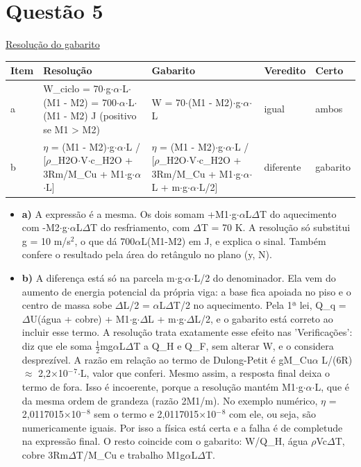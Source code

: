 \documentclass{article}%
\begin{document}
\section*{Questão 5}%
\href{https://poliedroresolve.sistemapoliedro.com.br/vestibulares/ita/2026/ita-2-fase-dia-3-30-10-2025-2-fase-dia-3/dissertativa-5-fisica-2-fase-dia-3-ita-2026}{Resolução do gabarito}\par\smallskip%
\begin{longtable}{@{}p{} p{} p{} p{} p{}@{}}\toprule Item & Resolução & Gabarito & Veredito & Certo \\ \midrule
a & W\_ciclo = 70$\cdot$g$\cdot$$\alpha$$\cdot$L$\cdot$(M1 - M2) = 700$\cdot$$\alpha$$\cdot$L$\cdot$(M1 - M2) J (positivo se M1 > M2) & W = 70$\cdot$(M1 - M2)$\cdot$g$\cdot$$\alpha$$\cdot$L & igual & ambos \\
b & $\eta$ = (M1 - M2)$\cdot$g$\cdot$$\alpha$$\cdot$L / {[}$\rho$\_H2O$\cdot$V$\cdot$c\_H2O + 3Rm/M\_Cu + M1$\cdot$g$\cdot$$\alpha$$\cdot$L{]} & $\eta$ = (M1 - M2)$\cdot$g$\cdot$$\alpha$$\cdot$L / {[}$\rho$\_H2O$\cdot$V$\cdot$c\_H2O + 3Rm/M\_Cu + M1$\cdot$g$\cdot$$\alpha$$\cdot$L + m$\cdot$g$\cdot$$\alpha$$\cdot$L/2{]} & diferente & gabarito \\
\bottomrule\end{longtable}%
\begin{itemize}%
\item%
\textbf{a)} A expressão é a mesma. Os dois somam +M1$\cdot$g$\cdot$$\alpha$L$\Delta$T do aquecimento com -M2$\cdot$g$\cdot$$\alpha$L$\Delta$T do resfriamento, com $\Delta$T = 70 K. A resolução só substitui g = 10 m/s$^2$, o que dá 700$\alpha$L(M1-M2) em J, e explica o sinal. Também confere o resultado pela área do retângulo no plano (y, N).%
\item%
\textbf{b)} A diferença está só na parcela m$\cdot$g$\cdot$$\alpha$$\cdot$L/2 do denominador. Ela vem do aumento de energia potencial da própria viga: a base fica apoiada no piso e o centro de massa sobe $\Delta$L/2 = $\alpha$L$\Delta$T/2 no aquecimento. Pela 1ª lei, Q\_q = $\Delta$U(água + cobre) + M1$\cdot$g$\cdot$$\Delta$L + m$\cdot$g$\cdot$$\Delta$L/2, e o gabarito está correto ao incluir esse termo. A resolução trata exatamente esse efeito nas 'Verificações': diz que ele soma $\frac12$mg$\alpha$L$\Delta$T a Q\_H e Q\_F, sem alterar W, e o considera desprezível. A razão em relação ao termo de Dulong{-}Petit é gM\_Cu$\alpha$ L/(6R) $\approx$ 2,2$\times$10$^{-}$$^{7}$$\cdot$L, valor que conferi. Mesmo assim, a resposta final deixa o termo de fora. Isso é incoerente, porque a resolução mantém M1$\cdot$g$\cdot$$\alpha$$\cdot$L, que é da mesma ordem de grandeza (razão 2M1/m). No exemplo numérico, $\eta$ = 2,0117015$\times$10$^{-}$$^{8}$ sem o termo e 2,0117015$\times$10$^{-}$$^{8}$ com ele, ou seja, são numericamente iguais. Por isso a física está certa e a falha é de completude na expressão final. O resto coincide com o gabarito: W/Q\_H, água $\rho$Vc$\Delta$T, cobre 3Rm$\Delta$T/M\_Cu e trabalho M1g$\alpha$L$\Delta$T.%
\end{itemize}%
\end{document}
